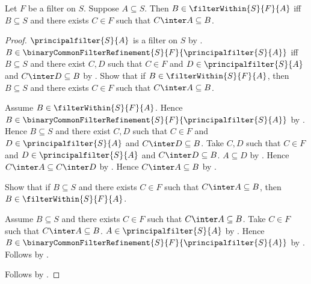 \begin{theorem}\label{filter_within_iff}
    Let $F$ be a filter on $S$.
    Suppose $A\subseteq S$.
    Then $B\in\filterWithin{S}{F}{A}$ iff
        $B\subseteq S$ and there exists $C\in F$ such that
        $C\inter A\subseteq B$.
\end{theorem}
\begin{proof}
    $\principalfilter{S}{A}$ is a filter on $S$ by
        .
    $B\in\binaryCommonFilterRefinement{S}{F}{\principalfilter{S}{A}}$ iff
        $B\subseteq S$ and there exist $C,D$ such that $C\in F$ and
        $D\in\principalfilter{S}{A}$ and $C\inter D\subseteq B$ by
        .
    Show that if $B\in\filterWithin{S}{F}{A}$, then
        $B\subseteq S$ and there exists $C\in F$ such that
        $C\inter A\subseteq B$.
    \begin{subproof}
        Assume $B\in\filterWithin{S}{F}{A}$.
        Hence $B\in\binaryCommonFilterRefinement{S}{F}{
            \principalfilter{S}{A}}$ by .
        Hence $B\subseteq S$ and there exist $C,D$ such that $C\in F$ and
            $D\in\principalfilter{S}{A}$ and $C\inter D\subseteq B$.
        Take $C,D$ such that $C\in F$ and
            $D\in\principalfilter{S}{A}$ and $C\inter D\subseteq B$.
        $A\subseteq D$ by .
        Hence $C\inter A\subseteq C\inter D$ by .
        Hence $C\inter A\subseteq B$ by .
    \end{subproof}
    Show that if $B\subseteq S$ and there exists $C\in F$ such that
        $C\inter A\subseteq B$, then $B\in\filterWithin{S}{F}{A}$.
    \begin{subproof}
        Assume $B\subseteq S$ and there exists $C\in F$ such that
            $C\inter A\subseteq B$.
        Take $C\in F$ such that $C\inter A\subseteq B$.
        $A\in\principalfilter{S}{A}$ by .
        Hence $B\in\binaryCommonFilterRefinement{S}{F}{
            \principalfilter{S}{A}}$ by \auto.
        Follows by .
    \end{subproof}
    Follows by \auto.
\end{proof}

